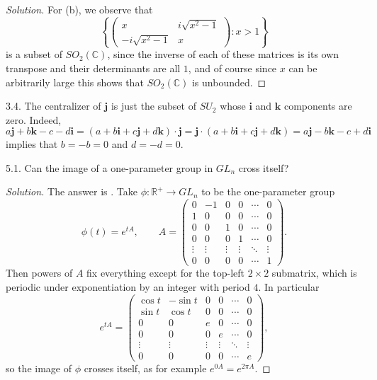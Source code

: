 \documentclass[11pt]{scrartcl}
\providecommand{\CC}{\mathbb C}
\providecommand{\RR}{\mathbb R}
\providecommand{\mb}[1]{\mathbf{#1}}
\newenvironment{soln}{\begin{proof}[Solution]}{\end{proof}}
\begin{document}
\begin{soln}
	For (b), we observe that
	\[\left\{\begin{pmatrix}
		x & i\sqrt{x^2-1}\\
		-i\sqrt{x^2-1}&x
	\end{pmatrix} : x > 1\right\}\]
	is a subset of $SO_2(\CC)$, since the inverse of each of these matrices
	is its own transpose and their determinants are all $1$,
	and of course since $x$ can be arbitrarily large
	this shows that $SO_2(\CC)$ is unbounded.
\end{soln}

\begin{problem*}3.4.
	The centralizer of $\mb j$ is just the subset of $SU_2$
	whose $\mb i$ and $\mb k$ components are zero.
	Indeed,
	\[a\mb j + b\mb k - c - d\mb i
	= (a + b\mb i + c\mb j + d\mb k)\cdot\mb j
	= \mb j\cdot (a + b\mb i + c\mb j + d\mb k)
	= a\mb j - b\mb k - c + d\mb i\]
	implies that $b = -b = 0$ and $d = -d = 0$.
\end{problem*}

\begin{problem*}5.1.
	Can the image of a one-parameter group in $GL_n$ cross itself?
\end{problem*}

\begin{soln}
	The answer is .
	Take $\phi\colon \RR^+\to GL_n$ to be the one-parameter group
	\[\phi(t) = e^{tA},\qquad A = \begin{pmatrix}
		0&-1&0&0&\cdots&0\\
		1&0&0&0&\cdots&0\\
		0&0&1&0&\cdots&0\\
		0&0&0&1&\cdots&0\\
		\vdots&\vdots&\vdots&\vdots&\ddots&\vdots\\
		0&0&0&0&\cdots&1
	\end{pmatrix}.\]
	Then powers of $A$ fix everything except for the top-left
	$2\times 2$ submatrix, which is periodic under exponentiation
	by an integer with period $4$. In particular
	\[e^{tA} = \begin{pmatrix}
		\cos t&-\sin t&0&0&\cdots&0\\
		\sin t&\cos t&0&0&\cdots&0\\
		0&0&e&0&\cdots&0\\
		0&0&0&e&\cdots&0\\
		\vdots&\vdots&\vdots&\vdots&\ddots&\vdots\\
		0&0&0&0&\cdots&e
	\end{pmatrix},\]
	so the image of $\phi$ crosses itself, as for example
	$e^{0A} = e^{2\pi A}$.
\end{soln}
\end{document}
